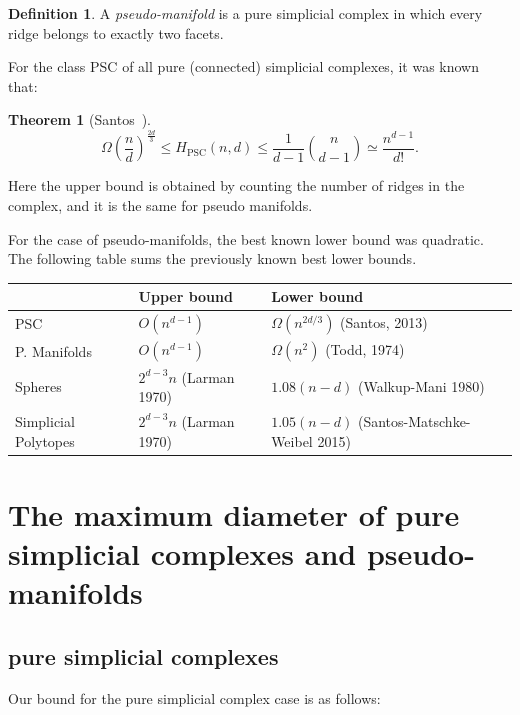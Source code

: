 \documentclass[12pt,a4paper]{article}
\newcommand{\PSC}{{\textrm{PSC}}}
\theoremstyle{plain}
\newtheorem{theorem}{Theorem}
\theoremstyle{definition}
\newtheorem{definition}{Definition}
\begin{document}
\begin{definition}
  A \emph{pseudo-manifold} is a pure simplicial complex in which every ridge belongs to exactly two facets.
\end{definition}

For the class PSC of all pure (connected) simplicial complexes, it was known that:

\begin{theorem}[Santos~]
\label{thm:Santosbound}
\[
  \Omega\left(\frac{n}{d}\right)^{\frac{2d}{3}} \le H_{\PSC}(n,d) \le \frac{1}{d-1}\binom{n}{d-1}\simeq \frac{n^{d-1}}{d!}.
\]
\end{theorem}

Here the upper bound is obtained by counting the number of ridges in the complex, and it is the same for pseudo manifolds.

For the case of pseudo-manifolds, the best known lower bound was quadratic. The following table sums the previously known best lower bounds.

\begin{center}
\begin{tabular}{p{2cm}|p{4cm}|p{4cm}|}
  &Upper bound & Lower bound \\ \hline
  PSC & $O(n^{d-1})$ & $\Omega(n^{2d/3})$ \newline (Santos, 2013) \\\hline
  P. Manifolds & $O(n^{d-1})$& $\Omega(n^2)$ \newline (Todd, 1974)\\\hline
  Spheres & $2^{d-3}n $ \newline(Larman 1970) & $1.08(n-d)$ \newline(Walkup-Mani 1980) \\\hline
  Simplicial Polytopes & $2^{d-3}n$ \newline(Larman 1970) & $1.05(n-d)$ \newline(Santos-Matschke-Weibel 2015) \\\hline
\end{tabular}
\end{center}

\section{The maximum diameter of pure simplicial complexes and pseudo-manifolds \cite{mypaper}}
\label{sec:mypaper}
\subsection{pure simplicial complexes}
Our bound for the pure simplicial complex case is as follows:
\end{document}
